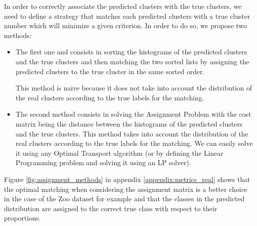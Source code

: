 \documentclass[a4paper,12pt]{article}
\begin{document}
In order to correctly associate the predicted clusters with the true clusters, we need to define a strategy that matches each predicted clusters with a true cluster number which will minimize a given criterion.
In order to do so, we propose two methods:
\begin{itemize}
    \item The first one and consists in sorting the histograms of the predicted clusters and the true clusters and then matching the two sorted lists by assigning the predicted clusters to the true cluster in the same sorted order.
    
    This method is naive because it does not take into account the distribution of the real clusters according to the true labels for the matching.
    
\item The second method consists in solving the Assignment Problem \citep{kuhn1955hungarian} with the cost matrix being the distance between the histograms of the predicted clusters and the true clusters. This method takes into account the distribution of the real clusters according to the true labels for the matching. We can easily solve it using any Optimal Transport algorithm (or by defining the Linear Programming problem and solving it using an LP solver).
\end{itemize}
Figure \ref{fig:assignment_methods} in appendix \ref{appendix:metrics_real} shows that the optimal matching when considering the assignment matrix is a better choice in the case of the Zoo dataset for example and that the classes in the predicted distribution are assigned to the correct true class with respect to their proportions.
\end{document}
